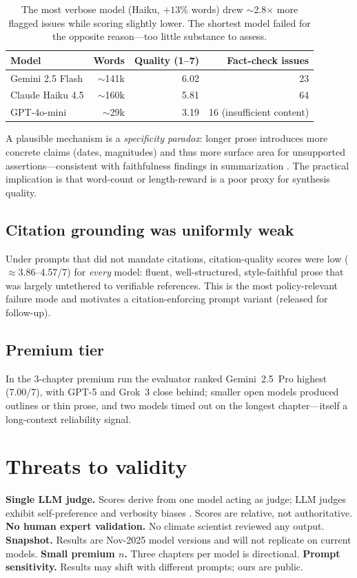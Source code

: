 \documentclass[11pt]{article}
\begin{document}
\begin{table}[h]
\centering
\begin{tabular}{lrrr}
\toprule
Model & Words & Quality (1--7) & Fact-check issues \\
\midrule
Gemini 2.5 Flash & $\sim$141k & 6.02 & 23 \\
Claude Haiku 4.5 & $\sim$160k & 5.81 & 64 \\
GPT-4o-mini      & $\sim$29k  & 3.19 & 16 (insufficient content) \\
\bottomrule
\end{tabular}
\caption{The most verbose model (Haiku, $+13\%$ words) drew $\sim$2.8$\times$ more
flagged issues while scoring slightly lower. The shortest model failed for the
opposite reason---too little substance to assess.}
\end{table}

A plausible mechanism is a \emph{specificity paradox}: longer prose introduces more
concrete claims (dates, magnitudes) and thus more surface area for unsupported
assertions---consistent with faithfulness findings in summarization
\citep{maynez2020faithfulness}. The practical implication is that word-count or
length-reward is a poor proxy for synthesis quality.

\subsection{Citation grounding was uniformly weak}
Under prompts that did not mandate citations, citation-quality scores were low
($\approx$3.86--4.57/7) for \emph{every} model: fluent, well-structured, style-faithful
prose that was largely untethered to verifiable references. This is the most
policy-relevant failure mode and motivates a citation-enforcing prompt variant
(released for follow-up).

\subsection{Premium tier}
In the 3-chapter premium run the evaluator ranked Gemini~2.5~Pro highest (7.00/7),
with GPT-5 and Grok~3 close behind; smaller open models produced outlines or thin
prose, and two models timed out on the longest chapter---itself a long-context
reliability signal.

\section{Threats to validity}\label{sec:threats}
\textbf{Single LLM judge.} Scores derive from one model acting as judge; LLM judges
exhibit self-preference and verbosity biases \citep{panickssery2024llm,
zheng2023judging}. Scores are relative, not authoritative.
\textbf{No human expert validation.} No climate scientist reviewed any output.
\textbf{Snapshot.} Results are Nov-2025 model versions and will not replicate on
current models. \textbf{Small premium $n$.} Three chapters per model is directional.
\textbf{Prompt sensitivity.} Results may shift with different prompts; ours are public.
\end{document}
